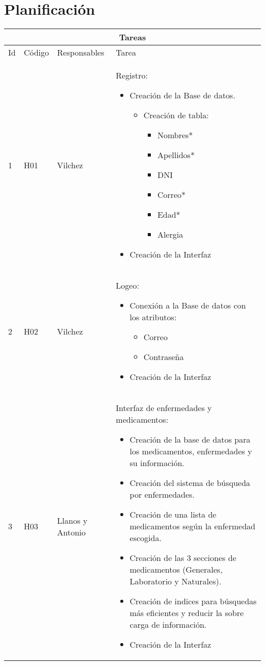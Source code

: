 \chapter{Planificación}

\begin{table}[htb]
\centering
\begin{tabular}{|l|p{1.5cm}|p{2.5cm}|p{10cm}|}
	\hline
	\multicolumn{4}{|c|}{Tareas} \\ \hline
	Id & Código & Responsables & Tarea \\
	\hline \hline
	1 & H01 & Vilchez & Registro:\begin{itemize}
		\item Creación de la Base de datos.
			\begin{itemize}
			\item Creación de tabla:
			 		\begin{itemize}
			 		\item Nombres*
			 		\item Apellidos*
			 		\item DNI
			 		\item Correo*
			 		\item Edad*
			 		\item Alergia		 	 
			 	\end{itemize}
			\end{itemize}
		\item Creación de la Interfaz
		
		
	\end{itemize}\\ \hline
	
	2 & H02 & Vilchez & Logeo: \begin{itemize}
		\item Conexión a la Base de datos con los atributos:							
			\begin{itemize}						
				\item Correo
				\item Contraseña	 	 				
			\end{itemize}
		
		\item Creación de la Interfaz
		\end{itemize}\\ \hline
	
	3 & H03 & Llanos y Antonio & Interfaz de enfermedades y medicamentos: 

	 \begin{itemize}
		\item Creación de la base de datos para los medicamentos, enfermedades y su información.
		\item Creación del sistema de búsqueda por enfermedades.
		\item Creación de una lista de medicamentos según la enfermedad escogida.
		\item Creación de las 3 secciones de medicamentos (Generales, Laboratorio y Naturales).
		\item Creación de indices para búsquedas más eficientes y reducir la sobre carga de información.
		\item Creación de la Interfaz
	\end{itemize}\\ \hline


\end{tabular}
\end{table}
